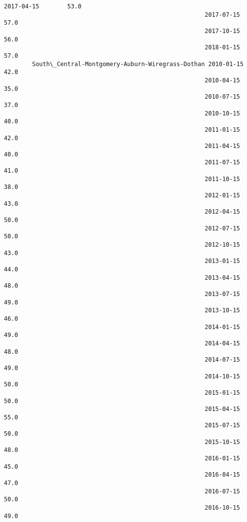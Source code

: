 \documentclass[11pt]{article}
\begin{document}
\begin{Verbatim}[commandchars=\\\{\}]
                                                         2017-04-15        53.0  
                                                         2017-07-15        57.0  
                                                         2017-10-15        56.0  
                                                         2018-01-15        57.0  
        South\_Central-Montgomery-Auburn-Wiregrass-Dothan 2010-01-15        42.0  
                                                         2010-04-15        35.0  
                                                         2010-07-15        37.0  
                                                         2010-10-15        40.0  
                                                         2011-01-15        42.0  
                                                         2011-04-15        40.0  
                                                         2011-07-15        41.0  
                                                         2011-10-15        38.0  
                                                         2012-01-15        43.0  
                                                         2012-04-15        50.0  
                                                         2012-07-15        50.0  
                                                         2012-10-15        43.0  
                                                         2013-01-15        44.0  
                                                         2013-04-15        48.0  
                                                         2013-07-15        49.0  
                                                         2013-10-15        46.0  
                                                         2014-01-15        49.0  
                                                         2014-04-15        48.0  
                                                         2014-07-15        49.0  
                                                         2014-10-15        50.0  
                                                         2015-01-15        50.0  
                                                         2015-04-15        55.0  
                                                         2015-07-15        50.0  
                                                         2015-10-15        48.0  
                                                         2016-01-15        45.0  
                                                         2016-04-15        47.0  
                                                         2016-07-15        50.0  
                                                         2016-10-15        49.0  

\end{Verbatim}
\end{document}
